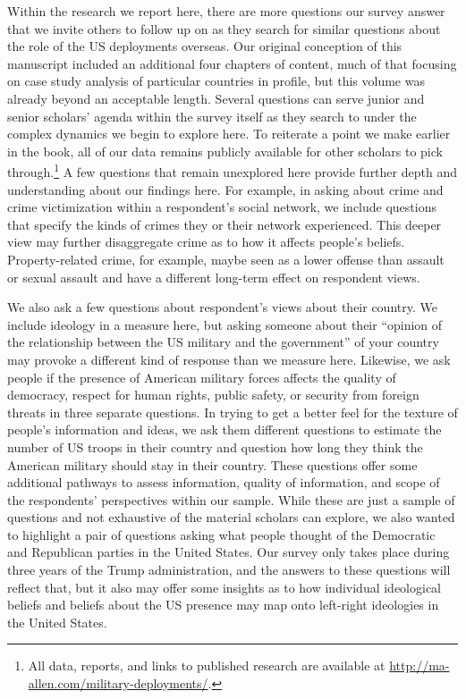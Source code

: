 Within the research we report here, there are more questions our survey answer that we invite others to follow up on as they search for similar questions about the role of the US deployments overseas. Our original conception of this manuscript included an additional four chapters of content, much of that focusing on case study analysis of particular countries in profile, but this volume was already beyond an acceptable length. Several questions can serve junior and senior scholars' agenda within the survey itself as they search to under the complex dynamics we begin to explore here. To reiterate a point we make earlier in the book, all of our data remains publicly available for other scholars to pick through.\footnote{All data, reports, and links to published research are available at \url{http://ma-allen.com/military-deployments/}.} A few questions that remain unexplored here provide further depth and understanding about our findings here. For example, in asking about crime and crime victimization within a respondent's social network, we include questions that specify the kinds of crimes they or their network experienced. This deeper view may further disaggregate crime as to how it affects people's beliefs. Property-related crime, for example, maybe seen as a lower offense than assault or sexual assault and have a different long-term effect on respondent views.

We also ask a few questions about respondent's views about their country. We include ideology in a measure here, but asking someone about their ``opinion of the relationship between the US military and the government'' of your country may provoke a different kind of response than we measure here. Likewise, we ask people if the presence of American military forces affects the quality of democracy, respect for human rights, public safety, or security from foreign threats in three separate questions. In trying to get a better feel for the texture of people's information and ideas, we ask them different questions to estimate the number of US troops in their country and question how long they think the American military should stay in their country. These questions offer some additional pathways to assess information, quality of information, and scope of the respondents' perspectives within our sample. While these are just a sample of questions and not exhaustive of the material scholars can explore, we also wanted to highlight a pair of questions asking what people thought of the Democratic and Republican parties in the United States. Our survey only takes place during three years of the Trump administration, and the answers to these questions will reflect that, but it also may offer some insights as to how individual ideological beliefs and beliefs about the US presence may map onto left-right ideologies in the United States. 


